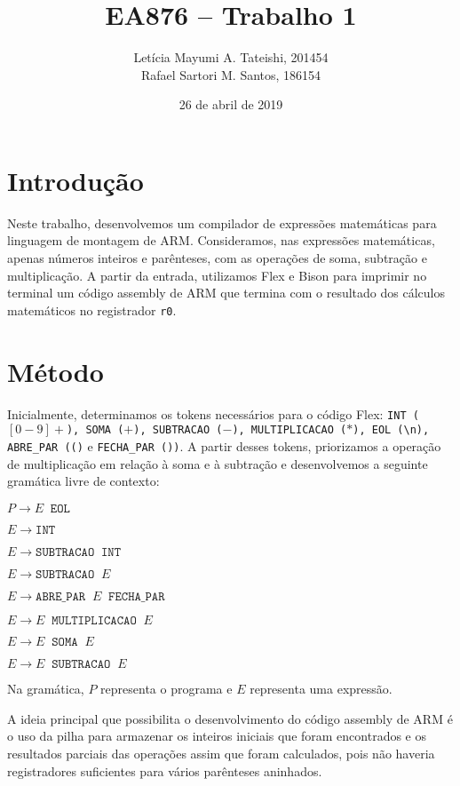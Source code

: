 \documentclass[brazilian,a4paper,twocolumn]{article}
\title{EA876 -- Trabalho 1}
\author{Letícia Mayumi A. Tateishi, 201454\\Rafael Sartori M. Santos, 186154}
\date{26 de abril de 2019}
\newcommand{\s}{\;\;}
\begin{document}
\maketitle

\section{Introdução}

    Neste trabalho, desenvolvemos um compilador de expressões matemáticas para linguagem de montagem de ARM. Consideramos, nas expressões matemáticas, apenas números inteiros e parênteses, com as operações de soma, subtração e multiplicação. A partir da entrada, utilizamos Flex e Bison para imprimir no terminal um código assembly de ARM que termina com o resultado dos cálculos matemáticos no registrador \texttt{r0}.

\section{Método}

    Inicialmente, determinamos os tokens necessários para o código Flex: \texttt{INT ($[0-9]+$), SOMA ($+$), SUBTRACAO ($-$), MULTIPLICACAO ($*$), EOL (\textbackslash{}n), ABRE\_PAR (()} e \texttt{FECHA\_PAR ())}. A partir desses tokens, priorizamos a operação de multiplicação em relação à soma e à subtração e desenvolvemos a seguinte gramática livre de contexto:

    $P \xrightarrow{} E \s \texttt{EOL}$

    $E \xrightarrow{} \texttt{INT}$

    $E \xrightarrow{} \texttt{SUBTRACAO} \s \texttt{INT}$

    $E \xrightarrow{} \texttt{SUBTRACAO} \s E$

    $E \xrightarrow{} \texttt{ABRE\_PAR} \s E \s \texttt{FECHA\_PAR}$

    $E \xrightarrow{} E \s \texttt{MULTIPLICACAO} \s E$

    $E \xrightarrow{} E \s \texttt{SOMA} \s E$

    $E \xrightarrow{} E \s \texttt{SUBTRACAO} \s E$

    Na gramática, $P$ representa o programa e $E$ representa uma expressão.

    A ideia principal que possibilita o desenvolvimento do código assembly de ARM é o uso da pilha para armazenar os inteiros iniciais que foram encontrados e os resultados parciais das operações assim que foram calculados, pois não haveria registradores suficientes para vários parênteses aninhados.
\end{document}
